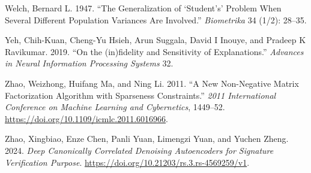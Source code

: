 \documentclass[
  letterpaper,
]{report}
\newlength{\cslhangindent}
\newenvironment{CSLReferences}[2] %
 {\begin{list}{}{%
  \setlength{\itemindent}{0pt}
  \setlength{\leftmargin}{0pt}
  \setlength{\parsep}{0pt}
  \ifodd #1
   \setlength{\leftmargin}{\cslhangindent}
   \setlength{\itemindent}{-1\cslhangindent}
  \fi
  \setlength{\itemsep}{#2\baselineskip}}}
 {\end{list}}
\begin{document}
\begin{CSLReferences}{1}{1}
Welch, Bernard L. 1947. {``The Generalization of {`Student's'} Problem
When Several Different Population Variances Are Involved.''}
\emph{Biometrika} 34 (1/2): 28--35.

Yeh, Chih-Kuan, Cheng-Yu Hsieh, Arun Suggala, David I Inouye, and
Pradeep K Ravikumar. 2019. {``On the (in)fidelity and Sensitivity of
Explanations.''} \emph{Advances in Neural Information Processing
Systems} 32.

Zhao, Weizhong, Huifang Ma, and Ning Li. 2011. {``A New Non-Negative
Matrix Factorization Algorithm with Sparseness Constraints.''}
\emph{2011 International Conference on Machine Learning and
Cybernetics}, 1449--52.
\url{https://doi.org/10.1109/icmlc.2011.6016966}.

Zhao, Xingbiao, Enze Chen, Panli Yuan, Limengzi Yuan, and Yuchen Zheng.
2024. \emph{Deep Canonically Correlated Denoising Autoencoders for
Signature Verification Purpose}.
\url{https://doi.org/10.21203/rs.3.rs-4569259/v1}.

\end{CSLReferences}
\end{document}
